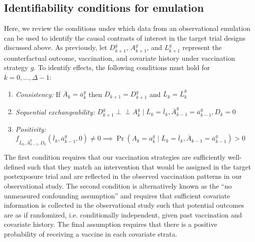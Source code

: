 \begin{appendices}
\begin{refsection}
    \section{Identifiability conditions for emulation}\label{sec:identifiability}
    Here, we review the conditions under which data from an observational emulation can be used to identify the causal contrasts of interest in the target trial designs discussed above. As previously, let $D^g_{k+1}$, $A^g_{k+1}$, and $L^g_{k+1}$ represent the counterfactual outcome, vaccination, and covariate history under vaccination strategy $g$. To identify effects, the following conditions must hold for $k = 0, \ldots, \Delta - 1$: 
    \begin{enumerate}
        \item \textit{Consistency:} If $\overline{A}_k = \overline{a}_k^g$ then $D_{k+1} = D^g_{k+1}$ and $\overline{L}_{k} = \overline{L}^g_{k}$
        \item \textit{Sequential exchangeability:} $D^g_{k+1} \perp \!\!\! \perp A^g_k \mid \overline{L}_k = \overline{l}_k, \overline{A}^g_{k-1} = \overline{a}_{k-1}^g, D_k = 0$
        \item \textit{Positivity:} $f_{\overline{L}_k,\overline{A}^g_{k-1},D_k}(\overline{l}_k, \overline{a}_{k-1}^g, 0) \neq 0 \implies \Pr(A_k = a^g_k \mid \overline{L}_k = \overline{l}_k, \overline{A}_{k -1} = \overline{a}^g_{k-1}) > 0$ 
    \end{enumerate}
    The first condition requires that our vaccination strategies are sufficiently well-defined such that they match an intervention that would be assigned in the target postexposure trial and are reflected in the observed vaccination patterns in our observational study. The second condition is alternatively known as the ``no unmeasured confounding assumption'' and requires that sufficient covariate information is collected in the observational study such that potential outcomes are as if randomized, i.e. conditionally independent, given past vaccination and covariate history. The final assumption requires that there is a positive probability of receiving a vaccine in each covariate strata.


\end{refsection}
\end{appendices}
